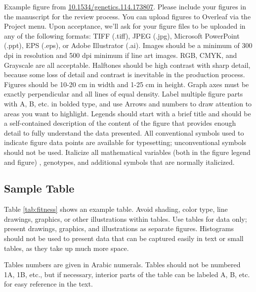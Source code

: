 \documentclass[9pt,twocolumn,twoside,lineno]{gsajnl}
\begin{document}
Example figure from \url{10.1534/genetics.114.173807}. Please include your figures in the manuscript for the review process. You can upload figures to Overleaf via the Project menu. Upon acceptance, we'll ask for your figure files to be uploaded in any of the following formats: TIFF (.tiff), JPEG (.jpg), Microsoft PowerPoint (.ppt), EPS (.eps), or Adobe Illustrator (.ai).  Images should be a minimum of 300 dpi in resolution and 500 dpi minimum if line art images.  RGB, CMYK, and Grayscale are all acceptable. Halftones should be high contrast with sharp detail, because some loss of detail and contrast is inevitable in the production process. Figures should be 10-20 cm in width and 1-25 cm in height. Graph axes must be exactly perpendicular and all lines of equal density.
Label multiple figure parts with A, B, etc. in bolded type, and use Arrows and numbers to draw attention to areas you want to highlight. Legends should start with a brief title and should be a self-contained description of the content of the figure that provides enough detail to fully understand the data presented. All conventional symbols used to indicate figure data points are available for typesetting; unconventional symbols should not be used. Italicize all mathematical variables (both in the figure legend and figure) , genotypes, and additional symbols that are normally italicized.  

\subsection{Sample Table}

Table \ref{tab:fitness} shows an example table. Avoid shading, color type, line drawings, graphics, or other illustrations within tables. Use tables for data only; present drawings, graphics, and illustrations as separate figures. Histograms should not be used to present data that can be captured easily in text or small tables, as they take up much more space.  

Tables numbers are given in Arabic numerals. Tables should not be numbered 1A, 1B, etc., but if necessary, interior parts of the table can be labeled A, B, etc. for easy reference in the text.  



\end{document}
